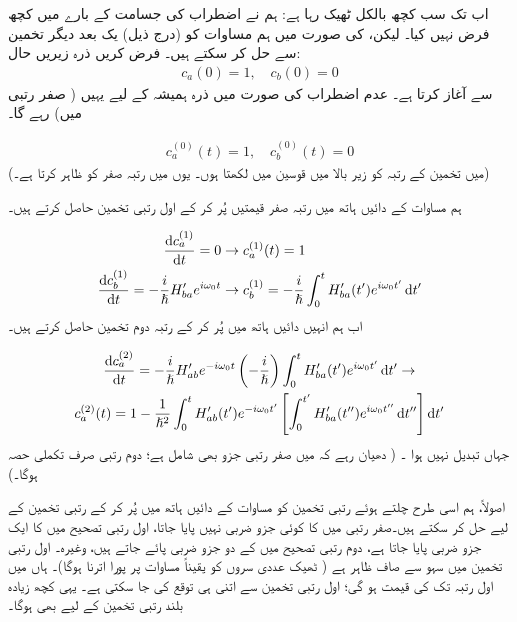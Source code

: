 اب تک سب کچھ بالکل ٹھیک   رہا ہے:  ہم نے اضطراب کی جسامت کے بارے میں کچھ فرض نہیں کیا۔ لیکن،      کی صورت میں ہم مساوات  کو (درج ذیل)  یک بعد دیگر تخمین سے حل کر سکتے ہیں۔  فرض کریں ذرہ زیریں حال:
\begin{align}
	c_a(0)=1,\quad c_b(0)=0
\end{align}
سے آغاز کرتا ہے۔ عدم  اضطراب کی صورت میں ذرہ ہمیشہ کے لیے یہیں (  صفر رتبی میں)  رہے گا۔

\begin{align}
	c^{(0)}_a(t)=1,\quad c_b^{(0)}(t)=0
\end{align}
(میں تخمین کے رتبہ کو زیر  بالا میں   قوسین میں لکھتا ہوں۔ یوں  میں   رتبہ صفر کو ظاہر کرتا ہے۔)

ہم مساوات  کے دائیں ہاتھ میں  رتبہ صفر  قیمتیں پُر کر کے اول رتبی  تخمین حاصل کرتے ہیں۔

\begin{gather}
\begin{aligned}\label{مساوات_تابع_مضطرب_اول_رتبی}
		\frac{\dif c_a^{(1)}}{\dif t}=0&\to c_a^{(1)}(t)=1 \\
		\frac{\dif c_b^{(1)}}{\dif t}=-\frac{i}{\hslash}H'_{ba}e^{i\omega_0t}&\to c_b^{(1)}=-\frac{i}{\hslash}\int_{0}^{t}H'_{ba}(t')e^{i\omega_0t'}\dif t'
\end{aligned}
\end{gather}
اب ہم انہیں دائیں ہاتھ میں  پُر کر کے رتبہ دوم تخمین حاصل کرتے ہیں۔

\begin{multline}
		\frac{\dif c_a^{(2)}}{\dif t}=-\frac{i}{\hslash}H'_{ab}e^{-i\omega_0t}\left(-\frac{i}{\hslash}\right)\int_{0}^{t}H'_{ba}(t')e^{i\omega_0t'}\dif t'\to \\
		c_a^{(2)}(t)=1-\frac{1}{\hslash^2}\int_{0}^{t}H'_{ab}(t')e^{-i\omega_0t'}\left[\int_{0}^{t'}H'_{ba}(t'')e^{i\omega_0t''}\dif t''\right]\dif t'
\end{multline}
جہاں  تبدیل نہیں ہوا ۔ ( دھیان رہے کہ  میں صفر رتبی جزو بھی  شامل ہے؛  دوم  رتبی   صرف تکملی حصہ ہوگا۔)

اصولاً،  ہم اسی طرح چلتے ہوئے  رتبی تخمین کو مساوات  کے دائیں ہاتھ میں پُر کر کے  رتبی تخمین  کے لیے حل کر سکتے ہیں۔صفر  رتبی  میں  کا کوئی جزو ضربی نہیں پایا جاتا،    اول رتبی  تصحیح میں  کا ایک جزو ضربی پایا جاتا ہے،  دوم  رتبی تصحیح میں  کے دو جزو ضربی پائے جاتے ہیں، وغیرہ۔  اول رتبی تخمین میں سہو 
   سے صاف ظاہر ہے ( ٹھیک  عددی سروں کو یقیناً  مساوات   پر پورا اترنا ہوگا)۔ ہاں  میں  اول رتبہ   تک           کی قیمت   ہو گی؛   اول  رتبی تخمین سے اتنی ہی توقع کی جا سکتی ہے۔ یہی کچھ زیادہ بلند رتبی تخمین کے لیے بھی    ہوگا۔

